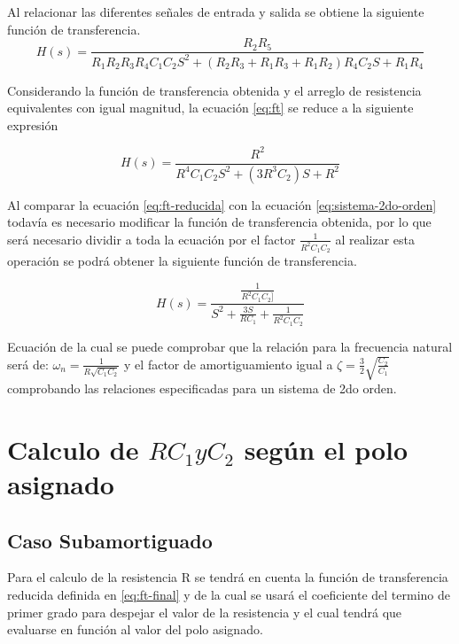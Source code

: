 \documentclass[conference]{IEEEtran}
\begin{document}
	Al relacionar las diferentes señales de entrada y salida se obtiene la siguiente función de transferencia.
	{\small
		\begin{equation}
			H(s) = \frac{R_2 R_5}{R_1 R_2 R_3 R_4 C_1 C_2 S^2 + (R_2 R_3 + R_1 R_3 + R_1 R_2)R_4 C_2 S + R_1 R_4}
			\label{eq:ft}
		\end{equation}
	}	
	
	Considerando la función de transferencia obtenida y el arreglo de resistencia equivalentes con igual magnitud, la ecuación \ref{eq:ft} se reduce a la siguiente expresión
	
	\begin{equation}
		H(s) = \frac{R^2}{R^4 C_1 C_2 S^2 + (3R^3 C_2)S + R^2}
		\label{eq:ft-reducida}
	\end{equation}
	
	Al comparar la ecuación \ref{eq:ft-reducida} con la ecuación \ref{eq:sistema-2do-orden} todavía es necesario modificar la función de transferencia obtenida, por lo que será necesario dividir a toda la ecuación por el factor $\frac{1}{R^2 C_1 C_2}$ al realizar esta operación se podrá obtener la siguiente función de transferencia.
	
	\begin{equation}
		H(s) = \frac{ \frac{1}{R^2C_1C_2]} }{ S^2 + \frac{3S}{RC_1} + \frac{1}{R^2C_1C_2}}
		\label{eq:ft-final}
	\end{equation}
	
	Ecuación de la cual se puede comprobar que la relación para la frecuencia natural será de: $\omega_n =\frac{1}{R \sqrt{C_1 C_2}}$ y el factor de amortiguamiento igual a $\zeta = \frac{3}{2} \sqrt{\frac{C_2}{C_1}}$ comprobando las relaciones especificadas para un sistema de 2do orden.
	
	\section{Calculo de $R C_1 y C_2$ según el polo asignado}
	\subsection{Caso Subamortiguado}
	
	Para el calculo de la resistencia R se tendrá en cuenta la función de transferencia reducida definida en \ref{eq:ft-final} y de la cual se usará el coeficiente del termino de primer grado para despejar el valor de la resistencia y el cual tendrá que evaluarse en función al valor del polo asignado.
	
\end{document}
